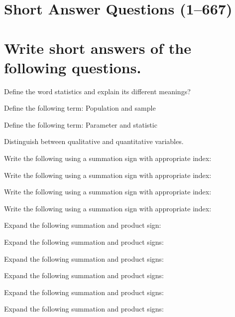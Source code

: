 \documentclass[11pt,a4paper]{article}
\begin{document}
\newpage

\section{Short Answer Questions (1--667)}

\section*{Write short answers of the following questions.}

\begin{shortlist}

\item Define the word statistics and explain its different meanings?

\item Define the following term: Population and sample

\item Define the following term: Parameter and statistic

\item Distinguish between qualitative and quantitative variables.

\item Write the following using a summation sign with appropriate index:

\item Write the following using a summation sign with appropriate index:

\item Write the following using a summation sign with appropriate index:

\item Write the following using a summation sign with appropriate index:

\item Expand the following summation and product sign:

\item Expand the following summation and product signs:

\item Expand the following summation and product signs:

\item Expand the following summation and product signs:

\item Expand the following summation and product signs:

\item Expand the following summation and product signs:


\end{shortlist}
\end{document}
